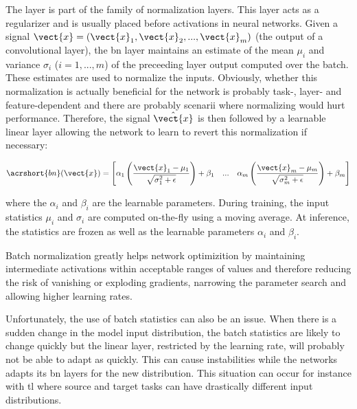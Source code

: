 The  \parencite{ioffe2015batch} layer is part of the family of normalization layers. This layer acts as a regularizer and is usually placed before activations in neural networks. Given a signal $\vect{x} = \left(\vect{x}_1, \vect{x}_2, ..., \vect{x}_m\right)$ (\eg the output of a convolutional layer), the \acrshort{bn} layer maintains an estimate of the mean $\mu_i$ and variance $\sigma_i$ ($i = 1, ..., m$) of the preceeding layer output computed over the batch. These estimates are used to normalize the inputs. Obviously, whether this normalization is actually beneficial for the network is probably task-, layer- and feature-dependent and there are probably scenarii where normalizing would hurt performance. Therefore, the signal $\hat{\vect{x}}$ is then followed by a learnable linear layer allowing the network to learn to revert this normalization if necessary:

\begin{equation}
\label{eqn:backml:bn}
\acrshort{bn}(\vect{x}) = \begin{bmatrix}
\alpha_1 \left(\dfrac{\vect{x}_1 - \mu_1}{\sqrt{\sigma^2_1 + \epsilon}}\right) + \beta_1 & ... & \alpha_m \left(\dfrac{\vect{x}_m - \mu_m}{\sqrt{\sigma^2_m + \epsilon}}\right) + \beta_m \\
\end{bmatrix}\end{equation} 

where the $\alpha_i$ and $\beta_i$ are the learnable parameters. During training, the input statistics $\mu_i$ and $\sigma_i$ are computed on-the-fly using a moving average. At inference, the statistics are frozen as well as the learnable parameters $\alpha_i$ and $\beta_i$.      
  
Batch normalization greatly helps network optimizition by maintaining intermediate activations within acceptable ranges of values and therefore reducing the risk of vanishing or exploding gradients, narrowing the parameter search and allowing higher learning rates. 

Unfortunately, the use of batch statistics can also be an issue. When there is a sudden change in the model input distribution, the batch statistics are likely to change quickly but the linear layer, restricted by the learning rate, will probably not be able to adapt as quickly. This can cause instabilities while the networks adapts its \acrlong{bn} layers for the new distribution. This situation can occur for instance with \acrlong{tl} where source and target tasks can have drastically different input distributions. 

